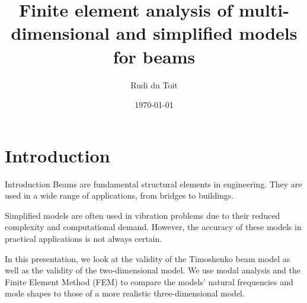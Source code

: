 \documentclass[8pt]{beamer}
\title{Finite element analysis of multi-dimensional and simplified models for beams}
\author{Rudi du Toit}
\date{\today}
\institute{University of Pretoria}
\begin{document}



\begin{frame}[plain]
\titlepage
\end{frame}

\section{Introduction}
    \begin{frame}{Introduction}
        Beams are fundamental structural elements in engineering. They are used in a wide range of applications, from bridges to buildings.
        \pause

        Simplified models are often used in vibration problems due to their reduced complexity and computational demand. However, the accuracy of these models in practical applications is not always certain.
        \pause

        In this presentation, we look at the validity of the Timoshenko beam model as well as the validity of the two-dimensional model. We use modal analysis and the Finite Element Method (FEM) to compare the models' natural frequencies and mode shapes to those of a more realistic three-dimensional model.
    \end{frame}
\end{document}
